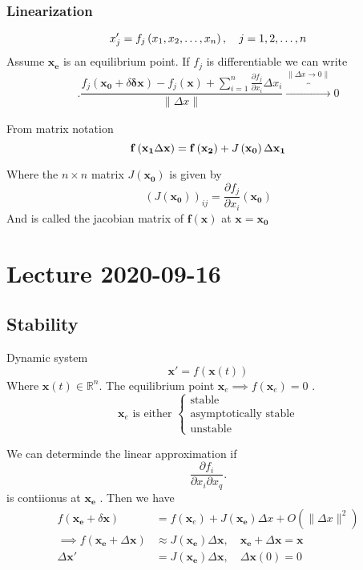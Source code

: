 \documentclass{article}
\theoremstyle{remark}
\begin{document}
\subsubsection{Linearization}%
\label{ssub:linearization}

\[
x_{j}'  =  f_{j} \left( x_{1}, x_{2} , \ldots , x_{n} \right) , \quad  j = 1,2, \ldots, n  \\
\] 
Assume $\mathbf{x_{e}}$ is an equilibrium point.  If $f_{j}$ is differentiable we can write \[
.
  \frac{f_{j} \left( \mathbf{x_{0} } + \delta  \mathbf{\delta x} \right) - f_{j}\left( \mathbf{x} \right) + \sum_{i=1}^{n}  \frac{\partial f_{j}}{\partial x_{i}}  \Delta x_{i}}{ \|\Delta x\|_{}^{}}  \overbrace{\to}^{ \|\Delta x \to  0\|_{}^{}}   0
\] 

From matrix notation \[
\mathbf{f}\left( \mathbf{x_{1} } \Delta  \mathbf{x} \right) =  \mathbf{f}\left( \mathbf{x_{2}} \right) + J \left( \mathbf{x_{0}} \right) \Delta \mathbf{x_{1}} \\
\] 

Where the $n\times n $ matrix $J\left( \mathbf{x_{0}} \right)$ is given by \[
\left( J\left( \mathbf{x_{0}} \right) \right)_{ij} = \frac{\partial f_{j}}{\partial x_{i}}  \left( \mathbf{x_{0}} \right)
\] 
And is called the jacobian matrix of $\mathbf{f}\left( \mathbf{x} \right)$ at $\mathbf{x} = \mathbf{x_{0}}$


\newpage
\section{Lecture 2020-09-16}%
\label{sec:lecture_2020_09_16}


\subsection{Stability}%
\label{sub:stability}
Dynamic system \[
\mathbf{x' } = f\left( \mathbf{x}\left( t \right) \right)
\] 
Where $\mathbf{x}\left( t \right) \in \mathbb{R} ^{n}$. The equilibrium point $\mathbf{x}_{e} \implies  f\left( \mathbf{x}_{e} \right) = 0$ . \[
\mathbf{x}_{e} \text{ is either } \begin{cases}
  \text{stable} \\
  \text{asymptotically stable} \\
  \text{unstable}
  
\end{cases}
\] 

We can determinde the linear approximation if \[
\frac{\partial f_{i}}{\partial x_{i} \partial  x_{q}} .
\] 
is contiionus at  $\mathbf{x_{e}}$ . Then we have \[
  \begin{split}
f\left( \mathbf{x_{e}} + \delta  \mathbf{x} \right)  & = f\left( \mathbf{x}_{e} \right) + J \left( \mathbf{x_{e}} \right) \Delta x  + O\left( \|\Delta x\|_{}^{2} \right)  \\
\implies  f\left( \mathbf{x_{e}} + \Delta \mathbf{x} \right)  & \approx J\left( \mathbf{x_{e}} \right) \Delta \mathbf{x}, \quad  \mathbf{x_{e}} + \Delta \mathbf{x}   = \mathbf{x}  \\
 \Delta \mathbf{x}'   & = J\left( \mathbf{x_{e}} \right) \Delta \mathbf{x}, \quad \Delta \mathbf{x} \left( 0 \right) = 0 
  \end{split} 
\]
\end{document}
